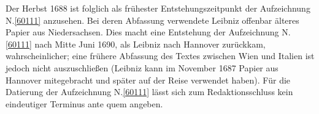 Der Herbst 1688 ist folglich als frühester Entstehungszeitpunkt der Aufzeichnung N.\;\ref{60111} anzusehen.
Bei deren Abfassung verwendete Leibniz offenbar älteres Papier aus Niedersachsen.
Dies macht eine Entstehung der Aufzeichnung N.\;\ref{60111} nach Mitte Juni 1690, als Leibniz nach Hannover zurückkam, wahrscheinlicher;
eine frühere Abfassung des Textes zwischen Wien und Italien ist jedoch nicht auszuschließen (Leibniz kann im November 1687 Papier aus Hannover mitegebracht und später auf der Reise verwendet haben).
\pend%
\pstart%
Für die Datierung der Aufzeichnung N.\;\ref{60111} lässt sich zum Redaktionsschluss kein eindeutiger Terminus ante quem angeben.
\pend%
%
\frenchspacing%
\normalsize%
